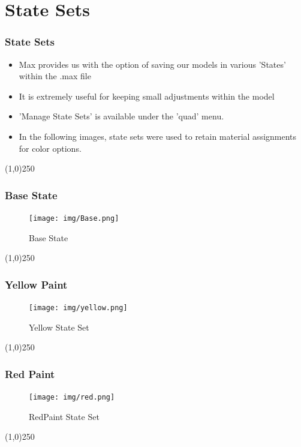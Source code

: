 \section{State Sets}

\begin{frame}
\frametitle{State Sets}
\begin{itemize}
	\item Max provides us with the option of saving our models in various 'States' within the .max file
	\item It is extremely useful for keeping small adjustments within the model
	\item 'Manage State Sets' is available under the 'quad' menu.
	\item In the following images, state sets were used to retain material assignments for color options.
\end{itemize}
\end{frame}
\begin{center}\line(1,0){250}\end{center}


\begin{frame}
\frametitle{Base State}
\begin{figure}
	\centering
		\texttt{[image: img/Base.png]}
	\caption{Base State}
	\label{fig:BaseState}
\end{figure}
\end{frame}
\begin{center}\line(1,0){250}\end{center}

\begin{frame}
\frametitle{Yellow Paint}
\begin{figure}
	\centering
		\texttt{[image: img/yellow.png]}
	\caption{Yellow State Set}
	\label{fig:yellow}
\end{figure}
\end{frame}
\begin{center}\line(1,0){250}\end{center}

\begin{frame}
\frametitle{Red Paint}
\begin{figure}
	\centering
		\texttt{[image: img/red.png]}
	\caption{RedPaint State Set}
	\label{fig:RedPaint}
\end{figure}
\end{frame}
\begin{center}\line(1,0){250}\end{center}

